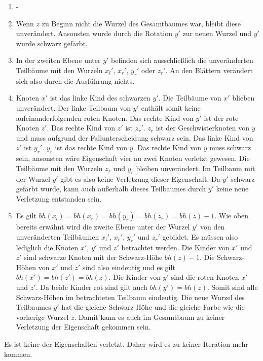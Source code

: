 \documentclass[a4paper,12pt]{article}
\begin{document}
\begin{enumerate}
	\item -
	\item Wenn $z$ zu Beginn nicht die Wurzel des Gesamtbaumes war, bleibt diese unverändert. Ansonsten wurde durch die Rotation $y'$ zur neuen Wurzel und $y'$ wurde schwarz gefärbt. 
	\item  In der zweiten Ebene unter $y'$ befinden sich ausschließlich die unveränderten Teilbäume mit den Wurzeln ${x_l}'$, ${x_r}'$, ${y_r}'$ oder ${z_r}'$. An den Blättern verändert sich also durch die Ausführung nichts.
	\item  Knoten $x'$ ist das linke Kind des schwarzen $y'$. Die Teilbäume von $x'$ blieben unverändert. Der linke Teilbaum von $y'$ enthält somit keine aufeinanderfolgenden roten Knoten. Das rechte Kind von $y'$ ist der rote Knoten $z'$. Das rechte Kind von $z'$ ist ${z_r}'$.  ${z_r}$ ist der Geschwisterknoten von $y$ und muss aufgrund der Fallunterscheidung schwarz sein. Das linke Kind von $z'$ ist ${y_r}'$. ${y_r}$ ist das rechte Kind von $y$. Das rechte Kind von $y$ muss schwarz sein, ansonsten wäre Eigenschaft vier an zwei Knoten verletzt gewesen. Die Teilbäume mit den Wurzeln ${z_r}$ und  ${y_r}$ bleiben unverändert. Im Teilbaum mit der Wurzel $y'$ gibt es also keine Verletzung dieser Eigenschaft. Da $y'$ schwarz gefärbt wurde, kann auch außerhalb dieses Teilbaumes durch $y'$ keine neue Verletzung entstanden sein.
	\item  Es gilt  $\mathit{bh(x_l)} = \mathit{bh(x_r)} = \mathit{bh(y_r)} =  \mathit{bh(z_r)} = \mathit{bh(z)} - 1$. Wie oben bereits erwähnt wird die zweite Ebene unter der Wurzel $y'$ von den unveränderten Teilbäumen ${x_l}'$, ${x_r}'$, ${y_r}'$ und ${z_r}'$ gebildet. Es müssen also lediglich die Knoten $x'$, $y'$ und $z'$ betrachtet werden. Die Kinder von $x'$ und $z'$ sind schwarze Knoten mit der Schwarz-Höhe $\mathit{bh(z)} - 1$. Die Schwarz-Höhen von $x'$ und $z'$ sind also eindeutig und es gilt \mbox{$\mathit{bh(x')} = \mathit{bh(z')} = \mathit{bh(z)}$}. Die Kinder von $y'$ sind die roten Knoten $x'$ und $z'$. Da beide Kinder rot sind gilt auch  $\mathit{bh(y')}  = \mathit{bh(z)}$. Somit sind alle Schwarz-Höhen im betrachteten Teilbaum eindeutig. Die neue Wurzel des Teilbaumes $y'$ hat die gleiche Schwarz-Höhe und die gleiche Farbe wie die vorherige Wurzel $z$. Damit kann es auch im Gesamtbaum zu keiner Verletzung der Eigenschaft gekommen sein.
\end{enumerate} 

\noindent Es ist keine der Eigenschaften verletzt. Daher wird es zu keiner Iteration mehr kommen.
\end{document}
